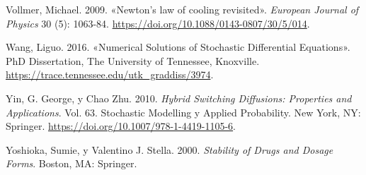 \documentclass[
  spanish,
  us-letterpaper,
]{scrreprt}
\newlength{\cslhangindent}
\newenvironment{CSLReferences}[2] %
 {\begin{list}{}{%
  \setlength{\itemindent}{0pt}
  \setlength{\leftmargin}{0pt}
  \setlength{\parsep}{0pt}
  \ifodd #1
   \setlength{\leftmargin}{\cslhangindent}
   \setlength{\itemindent}{-1\cslhangindent}
  \fi
  \setlength{\itemsep}{#2\baselineskip}}}
 {\end{list}}
\numberwithin{equation}{section}
\theoremstyle{plain}
\theoremstyle{plain}
\theoremstyle{plain}
\theoremstyle{definition}
\theoremstyle{remark}
\begin{document}
\begin{CSLReferences}{1}{0}
Vollmer, Michael. 2009. {«Newton's law of cooling revisited»}.
\emph{European Journal of Physics} 30 (5): 1063-84.
\url{https://doi.org/10.1088/0143-0807/30/5/014}.

Wang, Liguo. 2016. {«Numerical Solutions of Stochastic Differential
Equations»}. PhD Dissertation, The University of Tennessee, Knoxville.
\url{https://trace.tennessee.edu/utk_graddiss/3974}.

Yin, G. George, y Chao Zhu. 2010. \emph{Hybrid Switching Diffusions:
Properties and Applications}. Vol. 63. Stochastic Modelling y Applied
Probability. New York, NY: Springer.
\url{https://doi.org/10.1007/978-1-4419-1105-6}.

Yoshioka, Sumie, y Valentino J. Stella. 2000. \emph{Stability of Drugs
and Dosage Forms}. Boston, MA: Springer.

\end{CSLReferences}
\end{document}
